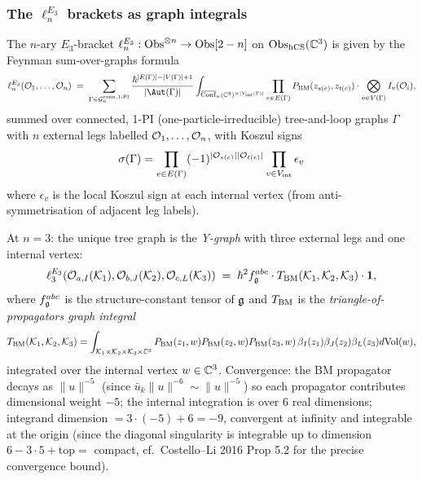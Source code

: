 \subsubsection{The $\ell_n^{E_3}$ brackets as graph integrals}

\begin{theorem}\ClaimStatusTheorem
\label{opus12:thm:ln-graph}
The $n$-ary $E_3$-bracket
$\ell_n^{E_3}: \mathrm{Obs}^{\otimes n} \to \mathrm{Obs}[2 - n]$ on
$\mathrm{Obs}_{\mathrm{hCS}}(\mathbb{C}^3)$ is given by the Feynman sum-over-graphs
formula
\[
\ell_n^{E_3}(\cO_1, \ldots, \cO_n) \;=\;
\sum_{\Gamma \in \mathcal G_n^{\mathrm{conn}, 1\text{-}\mathrm{PI}}}
\frac{\hbar^{|E(\Gamma)| - |V(\Gamma)| + 1}}
{|\Aut(\Gamma)|}
\int_{\overline{\Conf}_n(\CC^3)^{\times |V_{\mathrm{int}}(\Gamma)|}}
\prod_{e \in E(\Gamma)} P_{\BM}(z_{s(e)}, z_{t(e)}) \cdot
\bigotimes_{v \in V(\Gamma)} I_v(\cO_i),
\]
summed over connected, 1-PI (one-particle-irreducible) tree-and-loop
graphs $\Gamma$ with $n$ external legs labelled $\mathcal{O}_1, \ldots, \mathcal{O}_n$,
with Koszul signs
\[
\sigma(\Gamma) = \prod_{e \in E(\Gamma)} (-1)^{|\mathcal{O}_{s(e)}||\mathcal{O}_{t(e)}|}
\prod_{v \in V_{\mathrm{int}}} \epsilon_v
\]
where $\epsilon_v$ is the local Koszul sign at each internal vertex
(from anti-symmetrisation of adjacent leg labels).

At $n = 3$: the unique tree graph is the \emph{Y-graph} with three
external legs and one internal vertex:
\[
\ell_3^{E_3}(\mathcal{O}_{a, I}(\mathcal K_1), \mathcal{O}_{b, J}(\mathcal K_2),
\mathcal{O}_{c, L}(\mathcal K_3)) \;=\; \hbar^2 f^{abc}_{\mathfrak{g}} \cdot
T_{\mathrm{BM}}(\mathcal K_1, \mathcal K_2, \mathcal K_3) \cdot
\mathbf{1},
\]
where $f^{abc}_{\mathfrak{g}}$ is the structure-constant tensor of $\mathfrak{g}$ and
$T_{\mathrm{BM}}$ is the \emph{triangle-of-propagators graph integral}
\[
T_{\mathrm{BM}}(\mathcal K_1, \mathcal K_2, \mathcal K_3) =
\int_{\mathcal K_1 \times \mathcal K_2 \times \mathcal K_3 \times
\mathbb{C}^3} P_{\mathrm{BM}}(z_1, w) P_{\mathrm{BM}}(z_2, w) P_{\mathrm{BM}}(z_3, w)
\,\beta_{I}(z_1)\beta_{J}(z_2)\beta_{L}(z_3) d\mathrm{Vol}(w),
\]
integrated over the internal vertex $w \in \mathbb{C}^3$. Convergence: the
BM propagator decays as $\|u\|^{-5}$ (since $\bar u_k \|u\|^{-6}
\sim \|u\|^{-5}$) so each propagator contributes dimensional weight
$-5$; the internal integration is over 6 real dimensions; integrand
dimension $= 3 \cdot (-5) + 6 = -9$, convergent at infinity and
integrable at the origin (since the diagonal singularity is
integrable up to dimension $6 - 3\cdot 5 + \mathrm{top} = $
compact, cf.~Costello--Li 2016 Prop 5.2 for the precise convergence
bound).
\end{theorem}

